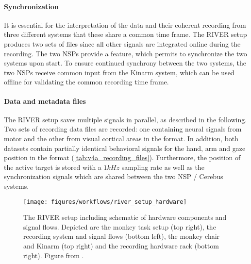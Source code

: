 \paragraph{Synchronization}
It is essential for the interpretation of the data and their coherent recording from three different systems that these share a common time frame. The RIVER setup produces two sets of  files since all other signals are integrated online during the recording. The two NSPs provide a feature, which permits to synchronize the two systems upon start. To ensure continued synchrony between the two systems, the two NSPs receive common input from the Kinarm system, which can be used offline for validating the common recording time frame.

\paragraph{Data and metadata files}
The RIVER setup saves multiple signals in parallel, as described in the following. Two sets of  recording data files are recorded: one containing neural signals from motor and the other from visual cortical areas in the  format. In addition, both datasets contain partially identical behavioral signals for the hand, arm and gaze position in the  format (\cref{tab:v4a_recording_files}). Furthermore, the position of the active target is stored with a $1kHz$ sampling rate as well as the synchronization signals which are shared between the two NSP / Cerebus systems.



\begin{sidewaysfigure}
 \texttt{[image: figures/workflows/river\_setup\_hardware]}
 \caption[The RIVER setup]{The RIVER setup including schematic of hardware components and signal flows. Depicted are the monkey task setup (top right), the recording system and signal flows (bottom left), the monkey chair and Kinarm (top right) and the recording hardware rack (bottom right). Figure from \citet{deHaan_2018a}.}
 \label{fig:river_setup}
\end{sidewaysfigure}


